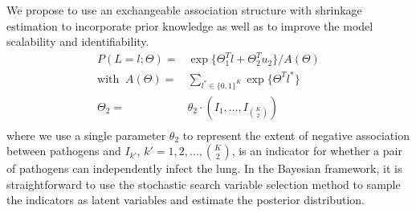 \documentclass[11 pt, a4paper]{article}  %
\begin{document}
We propose to use an exchangeable association structure with shrinkage estimation to incorporate prior knowledge as well as to improve the model scalability and identifiability.
\begin{align}
P(L=l; \Theta) = & \exp \{\Theta_1^T l + \Theta_2^{T} u_2 \}/ A(\Theta) \\ 
\text{with }\                                                   \nonumber
A(\Theta) = & \sum_{l^* \in \{0,1\}^K}\exp \{ \Theta^T l^*\} \\ \nonumber
\Theta_2 = & \theta_2 \cdot (I_1, \ldots, I_{{K \choose 2}}) \\ \nonumber
\end{align}
where we use a single parameter $\theta_2$ to represent the extent of negative association between pathogens and $I_{k'}$, $k' = 1, 2, \ldots, {K \choose 2}$, is an indicator for whether a pair of pathogens can independently infect the lung. In the Bayesian framework, it is straightforward to use the stochastic search variable selection \cite{george1993variable, george1996stochastic} method to sample the indicators as latent variables and estimate the posterior distribution.\\
\end{document}
